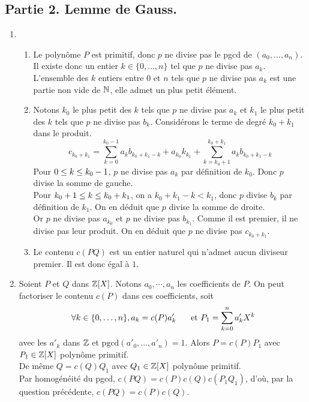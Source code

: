 \subsection*{Partie 2. Lemme de Gauss.}
\begin{enumerate}
\item
\begin{enumerate}
\item Le polynôme $P$ est primitif,  donc $p$ ne divise pas le pgcd de $(a_0, \dots, a_n)$. Il existe donc un entier $k\in\{0,\dots,n\}$ tel que $p$ ne divise pas $a_k$. L'ensemble des $k$ entiers entre $0$ et $n$ tels que $p$ ne divise pas $a_k$ est une partie non vide de $\mathbb{N}$, elle admet un plus petit élément.
\item  Notons $k_0$ le plus petit des $k$ tels que $p$ ne divise pas $a_k$ et $k_1$ le plus petit des $k$ tels que $p$ ne divise pas $b_k$. Considérons le terme de degré $k_0+k_1$ dans le produit.
\begin{displaymath}
 c_{k_0+k_1}=\sum_{k=0}^{k_0-1}a_kb_{k_0+k_1-k}+a_{k_0}k_{k_1}+\sum_{k=k_0+1}^{k_0+k_1}a_kb_{k_0+k_1-k}
\end{displaymath}
Pour $0\leq k\leq k_0-1$,  $p$ ne divise pas $a_k$ par définition de $k_0$. Donc $p$ divise  la somme de gauche. \\
Pour $k_0+1\leq k\leq k_0+k_1$, on a $k_0+k_1-k< k_1$, donc $p$ divise $b_k$ par définition de $k_1$. On en déduit que $p$ divise  la somme de droite.\\
Or $p$ ne divise pas $a_{k_0}$ et $p$ ne divise pas $b_{k_1}$. Comme il est premier, il ne divise pas leur produit. On en déduit que $p$ ne divise pas $c_{k_0+k_1}$.
\item Le contenu $c(PQ)$ est un entier naturel qui n'admet aucun diviseur premier. Il est donc égal à $1$.
\end{enumerate}

\item Soient $P$ et $Q$ dans $\mathbb{Z}[X]$. Notons $a_0,\cdots, a_n$ les coefficients de $P$. On peut factoriser le contenu $c(P)$ dans ces coefficients, soit
\begin{displaymath}
 \forall k\in\{0,\dots,n\},a_k=c(P)a'_k\hspace{0.5cm} \text{ et } P_1=\sum\limits_{k=0}^na'_kX^k
\end{displaymath}
avec les $a'_k$ dans $\mathbb{Z}$ et $\text{pgcd}(a'_0,\dots,a'_n)=1$. Alors $P=c(P)P_1$ avec $P_1\in\mathbb{Z}[X]$ polynôme primitif. \\
De même $Q=c(Q)Q_1$ avec $Q_1\in\mathbb{Z}[X]$ polynôme primitif. \\
Par homogénéité du pgcd, $c(PQ)=c(P)c(Q)c(P_1Q_1)$, d'où, par la question précédente, $c(PQ)=c(P)c(Q)$. 
\end{enumerate}

